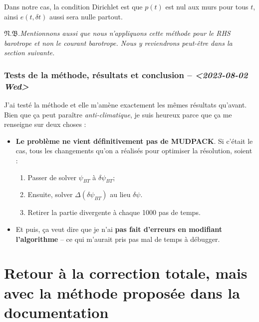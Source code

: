 \documentclass[10pt]{article}
\numberwithin{equation}{section}
\newcommand{\pt}{\hspace{1pt}} %
\newcommand{\nb}{\underline{{\footnotesize\EightStarConvex}\pt $\mathfrak{N.B.}$\vphantom{p}}\hspace{3pt}}
\begin{document}
Dans notre cas, la condition Dirichlet est que \(p(t)\) est nul aux murs pour tous \(t\), ainsi \(e(t,\delta t)\) aussi sera nulle partout.\bigskip

\nb \emph{Mentionnons aussi que nous n'appliquons cette méthode pour le RHS barotrope et non le courant barotrope. Nous y reviendrons peut-être dans la section suivante.}

\subsubsection{Tests de la méthode, résultats et conclusion -- \textit{<2023-08-02 Wed>}}
\label{sec:orgbd93ddd}
J'ai testé la méthode et elle m'amène exactement les mêmes résultats qu'avant.
Bien que ça peut paraître \emph{anti-climatique}, je suis heureux parce que ça me renseigne sur deux choses :
\begin{itemize}
\item \textbf{Le problème ne vient définitivement pas de MUDPACK}.
Si c'était le cas, tous les changements qu'on a réalisés pour optimiser la résolution, soient :
\begin{enumerate}
\item Passer de solver \(\psi_{BT}\) à \(\delta \psi_{BT}\);
\item Ensuite, solver \(\Delta (\delta \psi_{BT})\) au lieu \(\delta\psi\).
\item Retirer la partie divergente à chaque 1000 pas de temps.
\end{enumerate}

\item Et puis, ça veut dire que je n'ai \textbf{pas fait d'erreurs en modifiant l'algorithme} -- ce qui m'aurait pris pas mal de temps à débugger.
\end{itemize}


\section{Retour à la correction totale, mais avec la méthode proposée dans la documentation}
\label{sec:orgaf70696}
\end{document}

